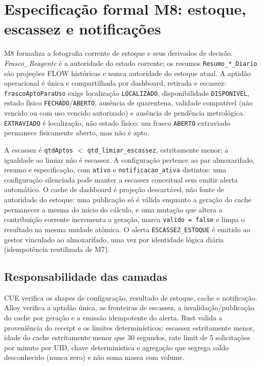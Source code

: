 \clearpage
\section{Especificação formal M8: estoque, escassez e notificações}
\label{sec:formal-m8}

M8 formaliza a fotografia corrente de estoque e seus derivados de decisão.
\textit{Frasco\_Reagente} é a autoridade do estado corrente; os resumos
\texttt{Resumo\_*\_Diario} são projeções FLOW históricas e nunca autoridade do
estoque atual. A aptidão operacional é única e compartilhada por dashboard,
retirada e escassez: \texttt{frascoAptoParaUso} exige localização
\texttt{LOCALIZADO}, disponibilidade \texttt{DISPONIVEL}, estado físico
\texttt{FECHADO}/\texttt{ABERTO}, ausência de quarentena, validade compatível
(não vencido ou com uso vencido autorizado) e ausência de pendência
metrológica. \texttt{EXTRAVIADO} é localização, não estado físico: um frasco
\texttt{ABERTO} extraviado permanece fisicamente aberto, mas não é apto.

A escassez é \texttt{qtdAptos} $<$ \texttt{qtd\_limiar\_escassez}, estritamente
menor; a igualdade ao limiar não é escassez. A configuração pertence ao par
almoxarifado, resumo e especificação, com \texttt{ativo} e
\texttt{notificacao\_ativa} distintos: uma configuração silenciada pode manter a
escassez conceitual sem emitir alerta automático. O cache de dashboard é
projeção descartável, não fonte de autoridade do estoque: uma publicação só é
válida enquanto a geração do cache permanecer a mesma do início do cálculo, e
uma mutação que altera a contribuição corrente incrementa a geração, marca
\texttt{valido = false} e limpa o resultado na mesma unidade atômica. O alerta
\texttt{ESCASSEZ\_ESTOQUE} é emitido ao gestor vinculado ao almoxarifado, uma
vez por identidade lógica diária (idempotência reutilizada de M7).

\subsection*{Responsabilidade das camadas}
CUE verifica os shapes de configuração, resultado de estoque, cache e
notificação. Alloy verifica a aptidão única, as fronteiras de escassez, a
invalidação/publicação do cache por geração e a emissão idempotente do alerta.
Rust valida a proveniência do receipt e os limites determinísticos: escassez
estritamente menor, idade do cache estritamente menor que 30 segundos, rate
limit de 5 solicitações por minuto por UID, chave determinística e agregação que
segrega saldo desconhecido (nunca zero) e não soma massa com volume.


